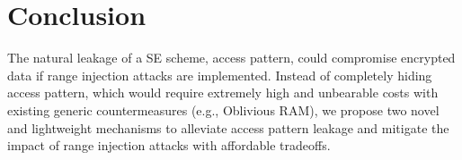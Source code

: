 \section{Conclusion} 
\label{sec:conclusion}

The natural leakage of a SE scheme, access pattern, could compromise encrypted data if range injection attacks are implemented. Instead of completely hiding access pattern, which would require extremely high and unbearable costs with existing generic countermeasures (e.g., Oblivious RAM), we propose two novel and lightweight mechanisms to alleviate access pattern leakage and mitigate the impact of range injection attacks with affordable tradeoffs.  